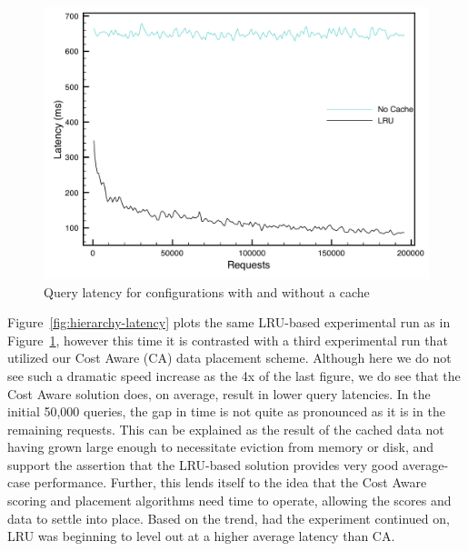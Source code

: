 \begin{figure}
\begin{center}
\includegraphics[scale=0.5]{figures/hierarchy-latency-nocache.pdf}
\end{center}
\caption{Query latency for configurations with and without a cache}
\label{fig:hierarchy-latency-nocache}
\end{figure}

Figure~\ref{fig:hierarchy-latency} plots the same LRU-based experimental run as
in Figure~\ref{fig:hierarchy-latency-nocache}, however this time it is
contrasted with a third experimental run that utilized our Cost Aware (CA)
data placement scheme. Although here we do not see such a dramatic speed
increase as the 4x of the last figure, we do see that the Cost Aware solution
does, on average, result in lower query latencies. In the initial 50,000
queries, the gap in time is not quite as pronounced as it is in the remaining
requests. This can be explained as the result of the cached data not having
grown large enough to necessitate eviction from memory or disk, and support the
assertion that the LRU-based solution provides very good average-case
performance. Further, this lends itself to the idea that the Cost Aware scoring
and placement algorithms need time to operate, allowing the scores and data to
settle into place. Based on the trend, had the experiment continued on, LRU was
beginning to level out at a higher average latency than CA.

